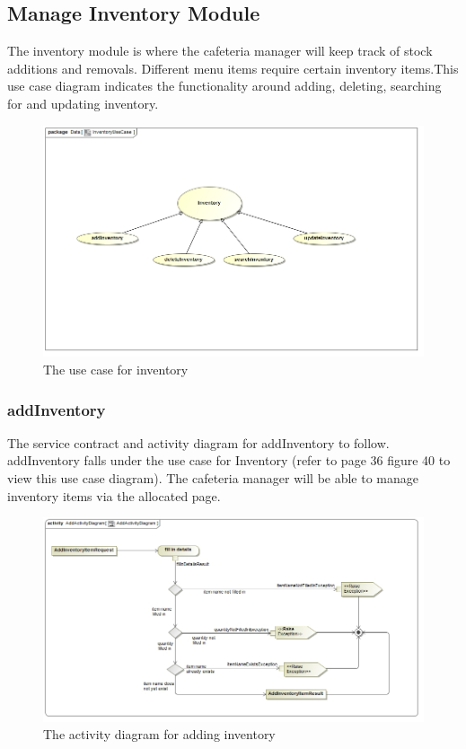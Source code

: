 \documentclass[a4paper,12pt]{report}
\begin{document}
\subsection{Manage Inventory Module}

The inventory module is where the cafeteria manager will keep track of stock additions and removals. Different menu items require certain inventory items.This use case diagram indicates the functionality around adding, deleting, searching for and updating inventory.

\begin{figure}[H]
  \centering
    \includegraphics[width=1.0\textwidth]{../images/InventoryUseCase.jpg}
    \caption{The use case for inventory} 
\end{figure}

\subsubsection{addInventory}
The service contract and activity diagram for addInventory to follow. addInventory falls under the use case for Inventory (refer to page 36 figure 40 to view this use case diagram). The cafeteria manager will be able to manage inventory items via the allocated page.
\begin{figure}[H]
  \centering
    \includegraphics[width=1.0\textwidth]{../images/AddActivityDiagram.jpg}
    \caption{The activity diagram for adding inventory} 
\end{figure}
\end{document}

